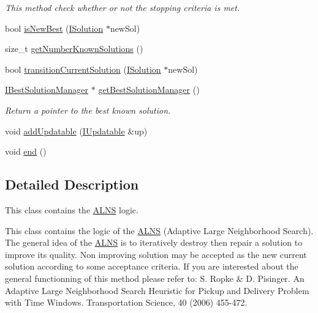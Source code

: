 \begin{DoxyCompactItemize}
\begin{DoxyCompactList}\small\item\em This method check whether or not the stopping criteria is met. \end{DoxyCompactList}\item 
bool \hyperlink{classALNS_a3dec1742b0f3e6bfc03a087ccb1cf5ee}{is\-New\-Best} (\hyperlink{classISolution}{I\-Solution} $\ast$new\-Sol)
\item 
size\-\_\-t \hyperlink{classALNS_a24567f634de0dd28dc09c7ccde13f7c2}{get\-Number\-Known\-Solutions} ()
\item 
bool \hyperlink{classALNS_a6c9c4ccbbfac3a70ef92dca8fbff68b4}{transition\-Current\-Solution} (\hyperlink{classISolution}{I\-Solution} $\ast$new\-Sol)
\item 
\hypertarget{classALNS_a8070a2581e7cee3cb46452eef5f97aaf}{\hyperlink{classIBestSolutionManager}{I\-Best\-Solution\-Manager} $\ast$ \hyperlink{classALNS_a8070a2581e7cee3cb46452eef5f97aaf}{get\-Best\-Solution\-Manager} ()}\label{classALNS_a8070a2581e7cee3cb46452eef5f97aaf}

\begin{DoxyCompactList}\small\item\em Return a pointer to the best known solution. \end{DoxyCompactList}\item 
void \hyperlink{classALNS_adde152b15ac1197b1b31232ee205072c}{add\-Updatable} (\hyperlink{classIUpdatable}{I\-Updatable} \&up)
\item 
void \hyperlink{classALNS_a6d32f5f1178d89d4f34fc19aff270a5b}{end} ()
\end{DoxyCompactItemize}


\subsection{Detailed Description}
This class contains the \hyperlink{classALNS}{A\-L\-N\-S} logic. 

This class contains the logic of the \hyperlink{classALNS}{A\-L\-N\-S} (Adaptive Large Neighborhood Search). The general idea of the \hyperlink{classALNS}{A\-L\-N\-S} is to iteratively destroy then repair a solution to improve its quality. Non improving solution may be accepted as the new current solution according to some acceptance criteria. If you are interested about the general functionning of this method please refer to\-: S. Ropke \& D. Pisinger. An Adaptive Large Neighborhood Search Heuristic for Pickup and Delivery Problem with Time Windows. Transportation Science, 40 (2006) 455-\/472. 

